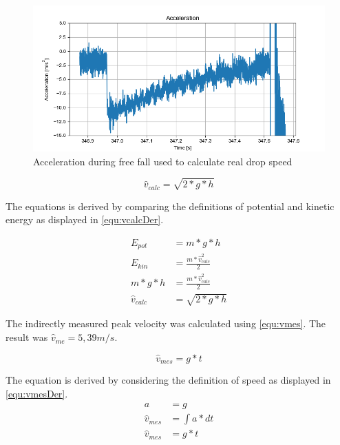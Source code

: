 \begin{figure}
    \centering
    \includegraphics[width=0.9\linewidth]{pics/speedcalc.png}
    \caption{Acceleration during free fall used to calculate real drop speed}
    \label{fig:speedcalc}
\end{figure}

\begin{equation}
    \hat{v}_{calc} = \sqrt{2 * g * h}
    \label{equ:vcalc}
\end{equation}

The equations is derived by comparing the definitions of potential and kinetic energy as displayed in \autoref{equ:vcalcDer}. 

\begin{subequations}
    \begin{align}
    E_{pot} &= m * g * h \label{equ:Epot}\\
    E_{kin} &=  \frac{m * \hat{v}_{calc}^2 }{2} \\
    m * g * h &= \frac{m * \hat{v}_{calc}^2 }{2} \\
    \hat{v}_{calc} &= \sqrt{2 * g * h}
    \end{align}
    \label{equ:vcalcDer}
\end{subequations}


The indirectly measured peak velocity was calculated using \autoref{equ:vmes}.  The result was \( \hat{v}_{me} = 5,39 m/s \).

\begin{equation}
 \hat{v}_{mes} = g * t
 \label{equ:vmes}
\end{equation}

The equation is derived by considering the definition of speed as displayed in \autoref{equ:vmesDer}.
\begin{subequations}
    \begin{align}
    a &= g \\
    \hat{v}_{mes} &= \int a * dt \\
    \hat{v}_{mes} &= g * t
    \end{align}
    \label{equ:vmesDer}
\end{subequations}

